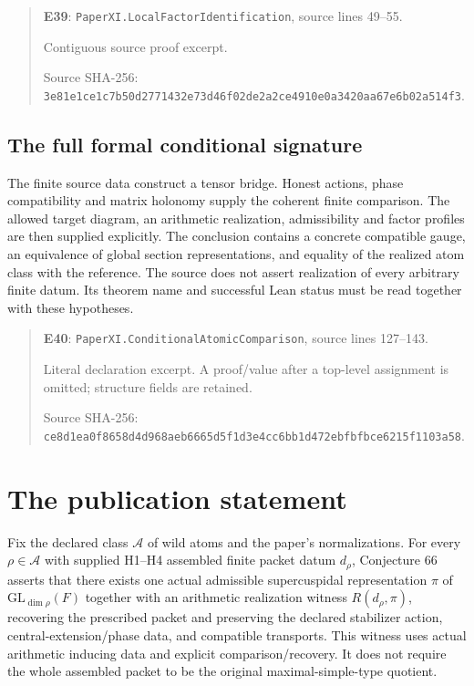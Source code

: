 \documentclass[10pt,oneside]{book}
\begin{document}
\begin{quote}\footnotesize\textbf{E39}: \nolinkurl{PaperXI.LocalFactorIdentification}, source lines 49--55.\par Contiguous source proof excerpt.\par Source SHA-256: {\scriptsize\texttt{3e81e1ce1c7b50d2771432e73d46f02de2a2ce4910e0a3420aa67e6b02a514f3}}.\end{quote}


\subsection{The full formal conditional signature}
\label{guide:E40}
The finite source data construct a tensor bridge. Honest actions, phase compatibility and matrix holonomy supply the coherent finite comparison. The allowed target diagram, an arithmetic realization, admissibility and factor profiles are then supplied explicitly.
The conclusion contains a concrete compatible gauge, an equivalence of global section representations, and equality of the realized atom class with the reference. The source does not assert realization of every arbitrary finite datum. Its theorem name and successful Lean status must be read together with these hypotheses.

\begin{quote}\footnotesize\textbf{E40}: \nolinkurl{PaperXI.ConditionalAtomicComparison}, source lines 127--143.\par Literal declaration excerpt. A proof/value after a top-level assignment is omitted; structure fields are retained.\par Source SHA-256: {\scriptsize\texttt{ce8d1ea0f8658d4d968aeb6665d5f1d3e4cc6bb1d472ebfbfbce6215f1103a58}}.\end{quote}


\section{The publication statement}
Fix the declared class \(\mathcal A\) of wild atoms and the paper's normalizations. For every \(\rho\in\mathcal A\) with supplied H1--H4 assembled finite packet datum \(d_\rho\), Conjecture 66 asserts that there exists one actual admissible supercuspidal representation \(\pi\) of \(\mathrm{GL}_{\dim\rho}(F)\) together with an arithmetic realization witness \(R(d_\rho,\pi)\), recovering the prescribed packet and preserving the declared stabilizer action, central-extension/phase data, and compatible transports. This witness uses actual arithmetic inducing data and explicit comparison/recovery. It does not require the whole assembled packet to be the original maximal-simple-type quotient.
\end{document}
